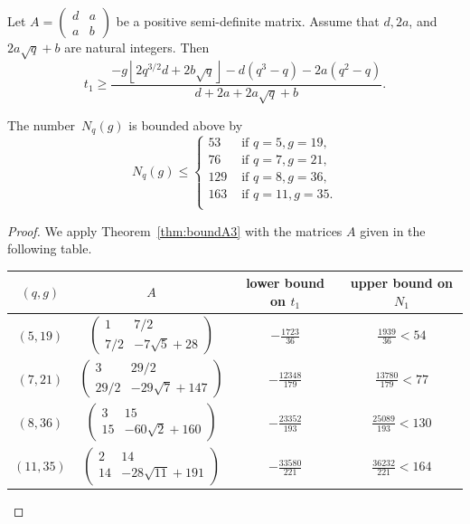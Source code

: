 \documentclass[10pt,a4paper]{amsart}
\begin{document}
\begin{theorem}\label{thm:boundA3}
Let $A = \begin{pmatrix}
d & a \\ a & b
\end{pmatrix}$ be a positive semi-definite matrix. Assume that $d, 2a$, and $2a\sqrt{q} + b$ are natural integers.
Then 
\[
t_1 \geq \frac{-g \left\lfloor  2q^{3/2}d +2b\sqrt{q} \right\rfloor-d(q^3-q)-2a(q^2-q)}{d+2a + 2a\sqrt{q}+b}. \]
\end{theorem}

\begin{theorem}\label{thm:rec3}
The number~$N_q(g)$ is bounded above by 
\[
N_q(g) \leq \begin{cases}
53 & \text{ if } q = 5 , g= 19, \\ 
76 & \text{ if } q = 7, g= 21, \\
129 & \text{ if } q = 8, g= 36, \\
163 & \text{ if } q = 11, g= 35. \\
\end{cases}
\]
\end{theorem}

\begin{proof} We apply Theorem~\ref{thm:boundA3} with the matrices $A$ given in the following table.

\begin{tabular}{ c  c  c  c   }
$(q,g)$  &  $A$ & lower bound on $t_1$ & upper bound on $N_1$  \\ \hline 
\rule{0pt}{4mm}%
$(5,19)$ & $\begin{pmatrix}
1 & 7/2 \\ 7/2 & -7\sqrt{5}+28
\end{pmatrix}$ &  $-\frac{1723}{36}$ &  $\frac{1939}{36} < 54$ \\
$(7,21)$ & $\begin{pmatrix}
3 & 29/2 \\ 29/2 & -29\sqrt{7}+147
\end{pmatrix}$ &  $-\frac{12348}{179}$ &  $\frac{13780}{179} < 77$ \\
$(8,36)$ & $\begin{pmatrix}
3 & 15 \\ 15 & -60\sqrt{2}+160
\end{pmatrix}$ &  $-\frac{23352}{193}$ &  $\frac{25089}{193} < 130$ \\
$(11,35)$ & $\begin{pmatrix}
2 & 14 \\ 14 & -28\sqrt{11}+191
\end{pmatrix}$ &  $-\frac{33580}{221}$ &  $\frac{36232}{221} < 164$ \\
\hline
\end{tabular}

\end{proof}
\end{document}
